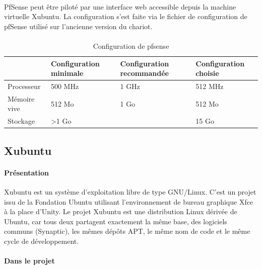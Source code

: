 \documentclass[a4paper,12pt]{extarticle}
\begin{document}
\paragraph{}
PfSense peut être piloté par une interface web accessible depuis la machine virtuelle Xubuntu. La configuration s’est faite via le fichier de configuration de pfSense utilisé sur l’ancienne version du chariot.\\


\paragraph{}
\begin{table}[!h]
\begin{tabular}{|p{3cm}|p{3cm}|p{3cm}|p{3cm}|}
\hline
 & Configuration minimale & Configuration recommandée & Configuration choisie\\
\hline 
Processeur & 500 MHz & 1 GHz & 512 MHz\\
\hline
Mémoire vive & 512 Mo & 1 Go & 512 Mo \\
\hline
Stockage & >1 Go & & 15 Go \\
\hline
\end{tabular}
\caption{Configuration de pfsense}
\end{table}


\subsection{Xubuntu}
\paragraph{Présentation\\}

Xubuntu est un système d'exploitation libre de type GNU/Linux. C'est un projet issu de la Fondation Ubuntu utilisant l'environnement de bureau graphique Xfce à la place d'Unity. Le projet Xubuntu est une distribution Linux dérivée de Ubuntu, car tous deux partagent exactement la même base, des logiciels communs (Synaptic), les mêmes dépôts APT, le même nom de code et le même cycle de développement.


\paragraph{Dans le projet\\}
\end{document}
